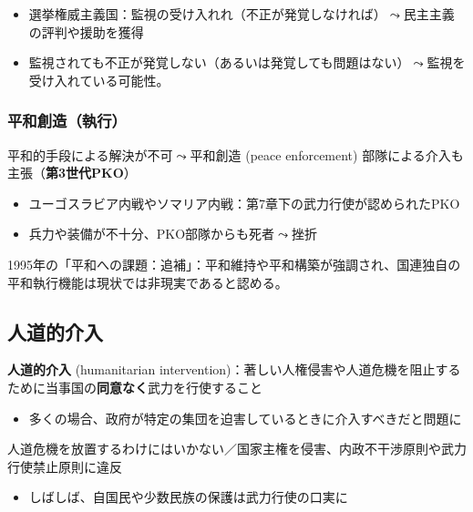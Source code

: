 \documentclass[
  xelatex,
  ja=standard]{bxjsarticle}
\providecommand{\tightlist}{%
  \setlength{\itemsep}{0pt}\setlength{\parskip}{0pt}}\usepackage{longtable,booktabs,array}
\begin{document}
\begin{itemize}
\tightlist
\item
  選挙権威主義国：監視の受け入れれ（不正が発覚しなければ）\(\leadsto\)民主主義の評判や援助を獲得
\item
  監視されても不正が発覚しない（あるいは発覚しても問題はない）\(\leadsto\)監視を受け入れている可能性。
\end{itemize}

\hypertarget{ux5e73ux548cux5275ux9020ux57f7ux884c}{%
\subsubsection{平和創造（執行）}\label{ux5e73ux548cux5275ux9020ux57f7ux884c}}

平和的手段による解決が不可\(\leadsto\)平和創造 (peace enforcement)
部隊による介入も主張（\textbf{第3世代PKO}）

\begin{itemize}
\tightlist
\item
  ユーゴスラビア内戦やソマリア内戦：第7章下の武力行使が認められたPKO
\item
  兵力や装備が不十分、PKO部隊からも死者\(\leadsto\)挫折
\end{itemize}

1995年の「平和への課題：追補」：平和維持や平和構築が強調され、国連独自の平和執行機能は現状では非現実であると認める。

\hypertarget{ux4ebaux9053ux7684ux4ecbux5165}{%
\subsection{人道的介入}\label{ux4ebaux9053ux7684ux4ecbux5165}}

\textbf{人道的介入} (humanitarian
intervention)：著しい人権侵害や人道危機を阻止するために当事国の\textbf{同意なく}武力を行使すること

\begin{itemize}
\tightlist
\item
  多くの場合、政府が特定の集団を迫害しているときに介入すべきだと問題に
\end{itemize}

人道危機を放置するわけにはいかない／国家主権を侵害、内政不干渉原則や武力行使禁止原則に違反

\begin{itemize}
\tightlist
\item
  しばしば、自国民や少数民族の保護は武力行使の口実に
\end{itemize}
\end{document}
